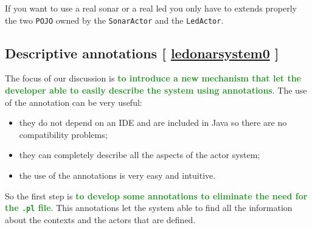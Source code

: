 If you want to use a real sonar or a real led you only have to extends properly the two \texttt{POJO} owned by the \texttt{SonarActor} and the \texttt{LedActor}.

\subsection{Descriptive annotations [ \href{https://github.com/LM-96/QA-Extensions/tree/main/it.unibo.ledsonardemo0}{\textcolor{Emerald}{\textbf{ledonarsystem0}}} ]}

The focus of our discussion is \textcolor{ForestGreen}{\textbf{to introduce a new mechanism that let the developer able to easily describe the system using annotations}}. The use of the annotation can be very useful:
\begin{itemize}
	\item they do not depend on an IDE and are included in Java so there are no compatibility problems;
	\item they can completely describe all the aspects of the actor system;
	\item the use of the annotations is very easy and intuitive.
\end{itemize}

So the first step is \textcolor{ForestGreen}{\textbf{to develop some annotations to eliminate the need for the \texttt{.pl} file}}. This annotations let the system able to find all the information about the contexts and the actors that are defined.

